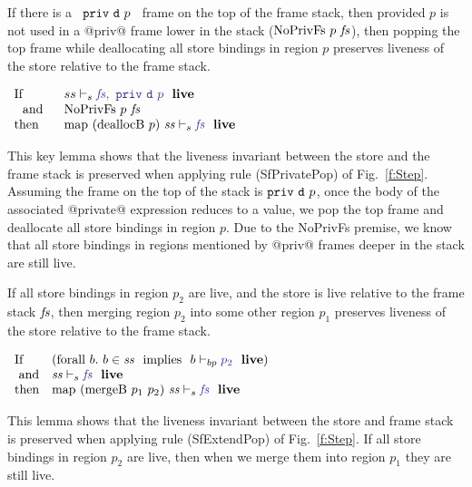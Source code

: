 %
\begin{lemma}
\label{l:liveS_dealloc}
If there is a ~$\texttt{priv}~ \texttt{d}~ p$~ frame on the top of the frame stack, then provided $p$ is not used in a @priv@ frame lower in the stack ($\textrm{NoPrivFs}~ p~ \mathit{fs}$), then popping the top frame while deallocating all store bindings in region $p$ preserves liveness of the store relative to the frame stack.
\end{lemma}
$
\begin{array}{ll}
    \pIf        & \LiveS{ss}{\mfs,~ \fprivd{p}} 
\\ ~~\pand~~    & \trm{NoPrivFs}~ p~ \mfs
\\  \pthen      & \LiveS{\mmap~ (\mdeallocB~ p)~ \mss}{\mfs}
\end{array}
$

\medskip\noindent
This key lemma shows that the liveness invariant between the store and the frame stack is preserved when applying rule (SfPrivatePop) of Fig.~\ref{f:Step}. Assuming the frame on the top of the stack is $\texttt{priv}~ \texttt{d}~ p$, once the body of the associated @private@ expression reduces to a value, we pop the top frame and deallocate all store bindings in region $p$. Due to the NoPrivFs premise, we know that all store bindings in regions mentioned by @priv@ frames deeper in the stack are still live. 
\qqed


\begin{lemma} If all store bindings in region $p_2$ are live, and the store is live relative to the frame stack $\mathit{fs}$, then merging region $p_2$ into some other region $p_1$ preserves liveness of the store relative to the frame stack.
\end{lemma}

$
\begin{array}{ll}
        \pIf    & (\pforall~ b.~ b \in \mss ~~\pimplies~~ \LiveBP{b}{p_2})
\\      ~\pand  & \LiveS{\mss}{\mfs}
\\      \pthen  & \LiveS{\trm{map}~ (\trm{mergeB}~ p_1~ p_2)~ \mss}{\mfs}
\end{array}
$

\medskip\noindent
This lemma shows that the liveness invariant between the store and frame stack is preserved when applying rule (SfExtendPop) of Fig.~\ref{f:Step}. If all store bindings in region $p_2$ are live, then when we merge them into region $p_1$ they are still live. 
\qqed





